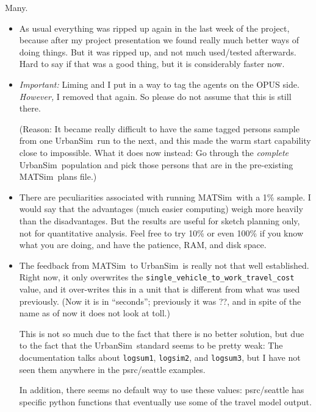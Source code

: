 \documentclass{article}
\def\matsim{MATSim}
\def\urbansim{UrbanSim}
\begin{document}
Many.  
\begin{itemize}

\item As usual everything was ripped up again in the last week of the
project, because after my project presentation we found really much
better ways of doing things.  But it was ripped up, and not much
used/tested afterwards.  Hard to say if that was a good thing, but it
is considerably faster now.

\item
\emph{Important:} Liming and I put in a way to tag the agents on the
OPUS side.  \emph{However,} I removed that again.  So please do not
assume that this is still there.

(Reason: It became really difficult to have the same tagged persons
sample from one \urbansim\ run to the next, and this made the warm
start capability close to impossible.  What it does now instead: Go
through the \emph{complete} \urbansim\ population and pick those
persons that are in the pre-existing \matsim\ plans file.)

\item There are peculiarities associated with running \matsim\ with a
1\% sample.  I would say that the advantages (much easier computing)
weigh more heavily than the disadvantages.  But the results are
useful for sketch planning only, not for quantitative analysis.  Feel
free to try 10\% or even 100\% if you know what you are doing, and
have the patience, RAM, and disk space.

\item The feedback from \matsim\ to \urbansim\ is really not that well
established.  Right now, it only overwrites the
\verb$single_vehicle_to_work_travel_cost$ value, and it over-writes
this in a unit that is different from what was used previously.
(Now it is in ``seconds''; previously it was ??, and in spite of the
name as of now it does not look at toll.)

This is not so much due to the fact that there is no better solution,
but due to the fact that the \urbansim\ standard seems to be pretty
weak: The documentation talks about \verb$logsum1$, \verb$logsim2$,
and \verb$logsum3$, but I have not seen them anywhere in the
psrc/seattle examples.

In addition, there seems no default way to use these values:
psrc/seattle has specific python functions that eventually use some of
the travel model output.

\end{itemize}
\end{document}
